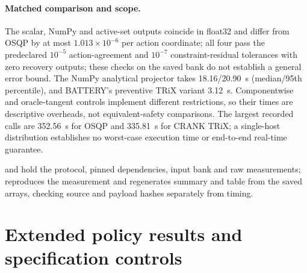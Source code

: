 \documentclass[10pt]{article}
\begin{document}
\paragraph{Matched comparison and scope.}
The scalar, NumPy and active-set outputs coincide in float32 and differ from
OSQP by at most $1.013\times10^{-6}$ per action coordinate; all four pass the
predeclared $10^{-5}$ action-agreement and $10^{-7}$ constraint-residual
tolerances with zero recovery outputs; these checks on the saved bank do not establish a general error bound. The NumPy analytical projector takes 18.16/20.90~\textmu s
(median/95th percentile), and BATTERY's preventive TRiX variant 3.12~\textmu s.
Componentwise and oracle-tangent controls implement different restrictions,
so their times are descriptive overheads, not equivalent-safety comparisons.
The largest recorded calls are 352.56~\textmu s for OSQP and 335.81~\textmu s for
CRANK TRiX; a single-host distribution establishes no worst-case execution
time or end-to-end real-time guarantee.

 and  hold the protocol,
pinned dependencies, input bank and raw measurements;
 reproduces the measurement and
regenerates summary and table from the saved arrays, checking source and
payload hashes separately from timing.

{\renewcommand{\mu}{\text{\textmu}}}



\section{Extended policy results and specification controls}
\end{document}
